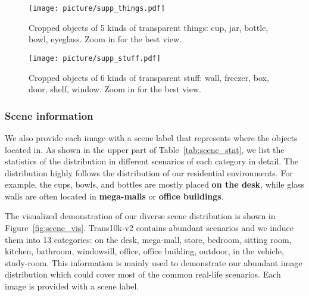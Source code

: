 \documentclass{article}
\begin{document}
 \begin{figure}[ht]
     \texttt{[image: picture/supp\_things.pdf]}
     \caption{Cropped objects of 5 kinds of transparent things: cup, jar, bottle, bowl, eyeglass. Zoom in for the best view.}
     \label{fig:experiment_supp_thing}
\end{figure}

\begin{figure}[ht]
     \texttt{[image: picture/supp\_stuff.pdf]}
     \caption{Cropped objects of 6 kinds of transparent stuff: wall, freezer, box, door, shelf, window. Zoom in for the best view.}
     \label{fig:experiment_supp_stuff}
\end{figure}


\begin{figure*}[t]
    \centering
    \caption{\textbf{More images and corresponding high-quality masks in Trans10K-v2.} Our dataset is high diversity in scale, categories, pose, contrast, occlusion, and transparency. Zoom in for the best view.}
    \label{fig:dataset_supp}
\end{figure*}

\subsubsection{Scene information}
We also provide each image with a scene label that represents where the objects located in. 
As shown in the upper part of Table~\ref{tab:scene_stat}, we list the statistics of the distribution in different scenarios of each category in detail. The distribution highly follows the distribution of our residential environments. For example, the cups, bowls, and bottles are mostly placed \textbf{on the desk}, while glass walls are often located in \textbf{mega-malls} or \textbf{office buildings}. 

The visualized demonstration of our diverse scene distribution is shown in Figure~\ref{fig:scene_vis}. Trans10k-v2 contains abundant scenarios and we induce them into 13 categories: on the desk, mega-mall, store, bedroom, sitting room, kitchen, bathroom, windowsill, office, office building, outdoor, in the vehicle, study-room. This information is mainly used to demonstrate our abundant image distribution which could cover most of the common real-life scenarios. Each image is provided with a scene label.

\begin{figure*}[ht]
    \centering
    \caption{The image number distribution and selected images of different scenes in Trans10K-v2. For better demonstration, the image number in vertical axis is listed as logarithmic.}
    \label{fig:scene_vis}
\end{figure*}
\end{document}
